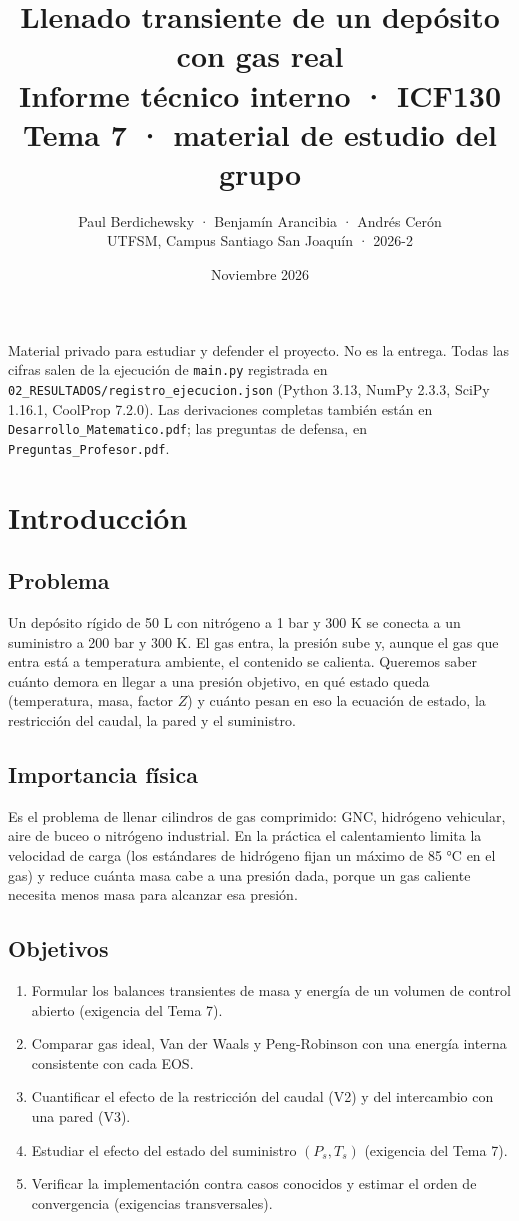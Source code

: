 \documentclass[11pt]{article}
\title{\color{tinta}\textbf{Llenado transiente de un depósito con gas real}\\[4pt]
\large Informe técnico interno · ICF130 Tema 7 · material de estudio del grupo}
\author{Paul Berdichewsky · Benjamín Arancibia · Andrés Cerón\\ \small UTFSM, Campus Santiago San Joaquín · 2026-2}
\date{Noviembre 2026}
\begin{document}
\maketitle
\begin{alerta}
Material privado para estudiar y defender el proyecto. No es la entrega. Todas las cifras salen de la
ejecución de \texttt{main.py} registrada en \texttt{02\_RESULTADOS/registro\_ejecucion.json}
(Python 3.13, NumPy 2.3.3, SciPy 1.16.1, CoolProp 7.2.0). Las derivaciones completas también están en
\texttt{Desarrollo\_Matematico.pdf}; las preguntas de defensa, en \texttt{Preguntas\_Profesor.pdf}.
\end{alerta}
\tableofcontents
\newpage

\section{Introducción}
\subsection{Problema}
Un depósito rígido de 50 L con nitrógeno a 1 bar y 300 K se conecta a un suministro a 200 bar y 300 K. El gas
entra, la presión sube y, aunque el gas que entra está a temperatura ambiente, el contenido se calienta.
Queremos saber cuánto demora en llegar a una presión objetivo, en qué estado queda (temperatura, masa,
factor $Z$) y cuánto pesan en eso la ecuación de estado, la restricción del caudal, la pared y el suministro.

\subsection{Importancia física}
Es el problema de llenar cilindros de gas comprimido: GNC, hidrógeno vehicular, aire de buceo o nitrógeno
industrial. En la práctica el calentamiento limita la velocidad de carga (los estándares de hidrógeno fijan
un máximo de 85 °C en el gas) y reduce cuánta masa cabe a una presión dada, porque un gas caliente necesita
menos masa para alcanzar esa presión.

\subsection{Objetivos}
\begin{enumerate}
\item Formular los balances transientes de masa y energía de un volumen de control abierto (exigencia del Tema 7).
\item Comparar gas ideal, Van der Waals y Peng-Robinson con una energía interna consistente con cada EOS.
\item Cuantificar el efecto de la restricción del caudal (V2) y del intercambio con una pared (V3).
\item Estudiar el efecto del estado del suministro $(P_s,T_s)$ (exigencia del Tema 7).
\item Verificar la implementación contra casos conocidos y estimar el orden de convergencia (exigencias transversales).
\end{enumerate}
\end{document}
